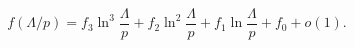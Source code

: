 \begin{equation}\label{f_Expansion}
f(\Lambda/p) = f_3 \ln^3 \frac{\Lambda}{p} + f_2 \ln^2\frac{\Lambda}{p}
+ f_1 \ln\frac{\Lambda}{p} + f_0 + o(1).
\end{equation}

